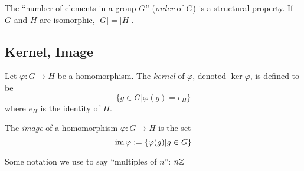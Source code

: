 \begin{note}
The ``number of elements in a group $G$'' (\textit{order} of $G$) is a structural property. If $G$ and $H$ are isomorphic, $|G|=|H|$.
\end{note}

\subsection{Kernel, Image}

\begin{definition}[Kernel]
Let $\varphi:G \rightarrow H$ be a homomorphism. The \textit{kernel} of $\varphi$, denoted $\ker\varphi$, is defined to be
\[\{g\in G | \varphi(g) = e_H\}\]
where $e_H$ is the identity of $H$.
\end{definition}

\begin{definition}[Image]
The \textit{image} of a homomorphism $\varphi:G \rightarrow H$ is the set
\[\operatorname{im}\varphi := \{\varphi(g) | g\in G\}\]
\end{definition}

\begin{note}
Some notation we use to say ``multiples of $n$'': $n\mathbb{Z}$
\end{note}

